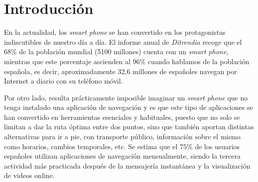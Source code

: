 \chapter{Introducción}
\label{cap:introduccion}




	

En la actualidad, los \textit{smart phone} se han convertido en los protagonistas indiscutibles de nuestro día a día. El informe anual de \textit{Ditrendia} recoge que el $68\%$ de la población mundial (5100 millones) cuenta con un \textit{smart phone}, mientras que este porcentaje ascienden al $96\%$ cuando hablamos de la población española, es decir, aproximadamente 32,6 millones de españoles navegan por Internet a diario con su teléfono móvil. 

Por otro lado, resulta prácticamente imposible imaginar un \textit{smart phone} que no tenga instalado una aplicación de navegación y es que este tipo de aplicaciones se han convertido en herramientas esenciales y habituales, puesto que no solo se limitan a dar la ruta óptima entre dos puntos, sino que también aportan distintas alternativas para ir a pie, con transporte público, información sobre el mismo como horarios, cambios temporales, etc. Se estima que el $75\%$ de los usuarios españoles utilizan aplicaciones de navegación mensualmente, siendo la tercera actividad más practicada después de la mensajería instantánea y la visualización de videos online.

